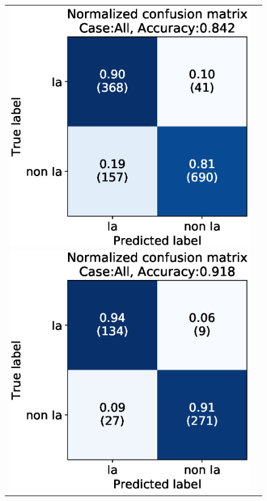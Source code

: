 \documentclass[useamsfonts]{pasj01}
\begin{document}
\begin{figure}[htbp]
    \begin{tabular}{cc}
        \begin{minipage}{0.5\hsize}
            \begin{center}
                \includegraphics[width=\columnwidth]{figures/10_CM_absolute-magnitude-scaled-flux-remove-y_SNdata_test_190522_2_Flagall_all.eps}
            \end{center}
        \end{minipage}
        \begin{minipage}{0.5\hsize}
            \begin{center}
                \includegraphics[width=\columnwidth]{figures/10_CM_absolute-magnitude-scaled-flux-remove-y_SNdata_test_190522_2_Flagall_noedge_spec.eps}

\end{center}
\end{minipage}
\end{tabular}
\end{figure}
\end{document}
